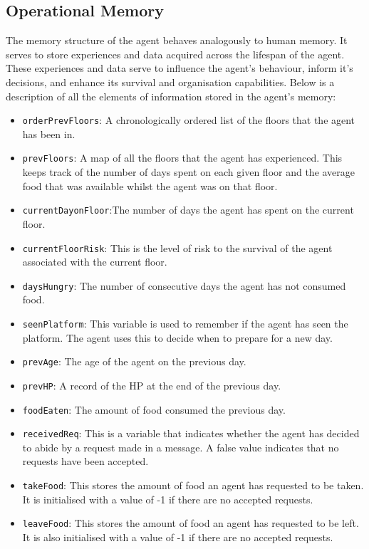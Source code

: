 \subsection{Operational Memory}
\label{subsec: Operational Memory}
The memory structure of the agent behaves analogously to human memory. It serves to store experiences and data acquired across the lifespan of the agent. These experiences and data serve to influence the agent's behaviour, inform it's decisions, and enhance its survival and organisation capabilities. 
Below is a description of all the elements of information stored in the agent's memory:

\begin{itemize}
    \item  \texttt{orderPrevFloors}: A chronologically ordered list of the floors that the agent has been in. 
    \item  \texttt{prevFloors}: A map of all the floors that the agent has experienced. This keeps track of the number of days spent on each given floor and the average food that was available whilst the agent was on that floor.
    \item  \texttt{currentDayonFloor}:The number of days the agent has spent on the current floor.
    \item  \texttt{currentFloorRisk}: This is the level of risk to the survival of the agent associated with the current floor. 
    \item  \texttt{daysHungry}: The number of consecutive days the agent has not consumed food.
    \item  \texttt{seenPlatform}: This variable is used to remember if the agent has seen the platform. The agent uses this to decide when to prepare for a new day.
    \item  \texttt{prevAge}: The age of the agent on the previous day.
    \item  \texttt{prevHP}: A record of the HP at the end of the previous day.
    \item  \texttt{foodEaten}: The amount of food consumed the previous day.
    \item  \texttt{receivedReq}: This is a variable that indicates whether the agent has decided to abide by a request made in a message. A false value indicates that no requests have been accepted. 
    \item  \texttt{takeFood}: This stores the amount of food an agent has requested to be taken. It is initialised with a value of -1 if there are no accepted requests.
    \item  \texttt{leaveFood}: This stores the amount of food an agent has requested to be left. It is also initialised with a value of -1 if there are no accepted requests.
\end{itemize}


